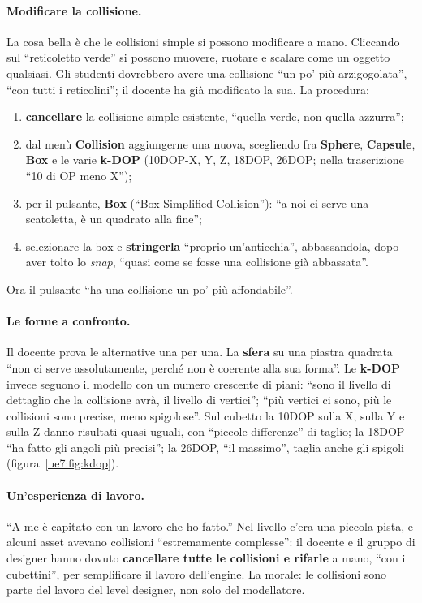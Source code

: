 \paragraph{Modificare la collisione.} La cosa bella è che le collisioni simple si
possono modificare a mano. Cliccando sul ``reticoletto verde'' si possono muovere,
ruotare e scalare come un oggetto qualsiasi. Gli studenti dovrebbero avere una
collisione ``un po' più arzigogolata'', ``con tutti i reticolini''; il docente ha già
modificato la sua. La procedura:
\begin{enumerate}
  \item \textbf{cancellare} la collisione simple esistente, ``quella verde, non quella
        azzurra'';
  \item dal menù \textbf{Collision} aggiungerne una nuova, scegliendo fra
        \textbf{Sphere}, \textbf{Capsule}, \textbf{Box} e le varie \textbf{k-DOP} (10DOP-X,
        Y, Z, 18DOP, 26DOP; nella trascrizione ``10 di OP meno X'');
  \item per il pulsante, \textbf{Box} (``Box Simplified Collision''): ``a noi ci serve
        una scatoletta, è un quadrato alla fine'';
  \item selezionare la box e \textbf{stringerla} ``proprio un'anticchia'', abbassandola,
        dopo aver tolto lo \emph{snap}, ``quasi come se fosse una collisione già
        abbassata''.
\end{enumerate}
Ora il pulsante ``ha una collisione un po' più affondabile''.

\paragraph{Le forme a confronto.} Il docente prova le alternative una per una. La
\textbf{sfera} su una piastra quadrata ``non ci serve assolutamente, perché non è
coerente alla sua forma''. Le \textbf{k-DOP} invece seguono il modello con un numero
crescente di piani: ``sono il livello di dettaglio che la collisione avrà, il livello di
vertici''; ``più vertici ci sono, più le collisioni sono precise, meno spigolose''. Sul
cubetto la 10DOP sulla X, sulla Y e sulla Z danno risultati quasi uguali, con ``piccole
differenze'' di taglio; la 18DOP ``ha fatto gli angoli più precisi''; la 26DOP, ``il
massimo'', taglia anche gli spigoli (figura~\ref{ue7:fig:kdop}).

\paragraph{Un'esperienza di lavoro.} ``A me è capitato con un lavoro che ho fatto.'' Nel
livello c'era una piccola pista, e alcuni asset avevano collisioni ``estremamente
complesse'': il docente e il gruppo di designer hanno dovuto \textbf{cancellare tutte le
collisioni e rifarle} a mano, ``con i cubettini'', per semplificare il lavoro
dell'engine. La morale: le collisioni sono parte del lavoro del level designer, non solo
del modellatore.

